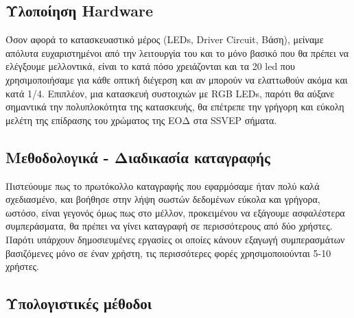 \documentclass[11pt,a4paper,english,greek,twoside]{../Thesis}
\begin{document}
\subsection{Υλοποίηση Hardware}
Όσον αφορά το κατασκευαστικό μέρος (LEDs, Driver Circuit, Βάση), μείναμε απόλυτα ευχαριστημένοι από την λειτουργία του και το μόνο βασικό που θα πρέπει να ελέγξουμε μελλοντικά, είναι το κατά πόσο χρειάζονται και τα 20 led που χρησιμοποιήσαμε για κάθε οπτική διέγερση και αν μπορούν να ελαττωθούν ακόμα και κατά 1/4. Επιπλέον, μια κατασκευή συστοιχιών με RGB LEDs, παρότι θα αύξανε σημαντικά την πολυπλοκότητα της κατασκευής, θα επέτρεπε την γρήγορη και εύκολη μελέτη της επίδρασης του χρώματος της ΕΟΔ στα SSVEP σήματα. 


\subsection{Μεθοδολογικά - Διαδικασία καταγραφής}
Πιστεύουμε πως το πρωτόκολλο καταγραφής που εφαρμόσαμε ήταν πολύ καλά σχεδιασμένο, και βοήθησε στην λήψη σωστών δεδομένων εύκολα και γρήγορα, ωστόσο, είναι γεγονός όμως πως στο μέλλον, προκειμένου να εξάγουμε ασφαλέστερα συμπεράσματα, θα πρέπει να γίνει καταγραφή σε περισσότερους από δύο χρήστες. Παρότι υπάρχουν δημοσιευμένες εργασίες οι οποίες κάνουν εξαγωγή συμπερασμάτων βασιζόμενες μόνο σε έναν χρήστη, τις περισσότερες φορές χρησιμοποιούνται 5-10 χρήστες.

\subsection{Υπολογιστικές μέθοδοι}

\end{document}
